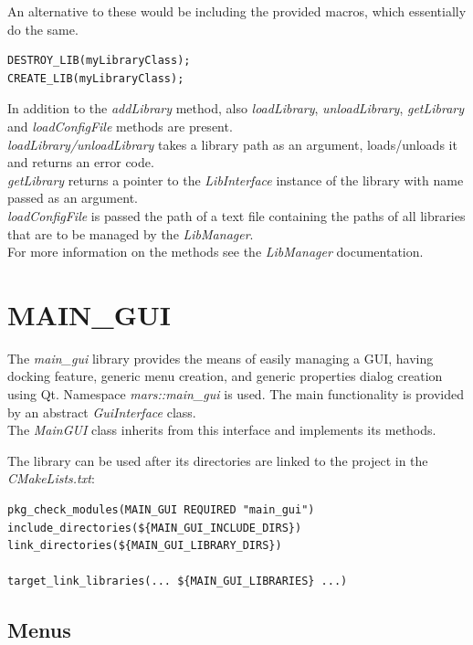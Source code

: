 \documentclass{article}
\begin{document}
An alternative to these would be including the provided macros, which essentially do the same.

\begin{lstlisting}
DESTROY_LIB(myLibraryClass);
CREATE_LIB(myLibraryClass);
\end{lstlisting}

In addition to the \emph{addLibrary} method, also \emph{loadLibrary}, \emph{unloadLibrary}, \emph{getLibrary} and \emph{loadConfigFile} methods are present.\\

\emph{loadLibrary/unloadLibrary} takes a library path as an argument, loads/unloads it and returns an error code.\\

\emph{getLibrary} returns a pointer to the \emph{LibInterface} instance of the library with name passed as an argument.\\

\emph{loadConfigFile} is passed the path of a text file containing the paths of all libraries that are to be managed by the \emph{LibManager}.\\
For more information on the methods see the \emph{LibManager} documentation.


\section{MAIN\_GUI}

The \emph{main\_gui} library provides the means of easily managing a GUI, having docking feature, generic menu creation, and generic properties dialog creation using Qt. Namespace \emph{mars::main\_gui} is used. The main functionality is provided by an abstract \emph{GuiInterface} class.\\

The \emph{MainGUI} class inherits from this interface and implements its methods.

The library can be used after its directories are linked to the project in the \emph{CMakeLists.txt}:

\begin{lstlisting}
pkg_check_modules(MAIN_GUI REQUIRED "main_gui")
include_directories(${MAIN_GUI_INCLUDE_DIRS})
link_directories(${MAIN_GUI_LIBRARY_DIRS})

target_link_libraries(... ${MAIN_GUI_LIBRARIES} ...)
\end{lstlisting}

\subsection{Menus}
\end{document}
